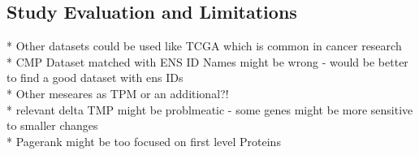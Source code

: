 \subsection{Study Evaluation and Limitations} \label{subsec:evaluation}

{\color{lightgray}
* Other datasets could be used like TCGA which is common in cancer research \\
* CMP Dataset matched with ENS ID Names might be wrong - would be better to find a good dataset with ens IDs \\
* Other meseares as TPM or an additional?! \\
* relevant delta TMP might be problmeatic - some genes might be more sensitive to smaller changes \\
* Pagerank might be too focused on first level Proteins \\
}

